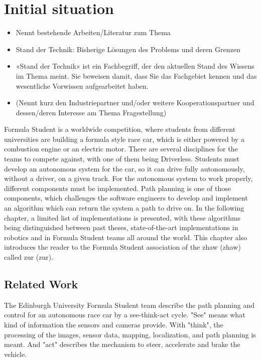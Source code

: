 \section{Initial situation} \label{sec:Initial situation}
\begin{itemize}
    \item Nennt bestehende Arbeiten/Literatur zum Thema
    \item Stand der Technik: Bisherige Lösungen des Problems und deren Grenzen
    \item «Stand der Technik» ist ein Fachbegriff, der den aktuellen Stand des Wissens im Thema meint. Sie beweisen damit, dass Sie das Fachgebiet kennen und das wesentliche Vorwissen aufgearbeitet haben.
    \item (Nennt kurz den Industriepartner und/oder weitere Kooperationspartner und dessen/deren Interesse am Thema Fragestellung)
\end{itemize}
Formula Student is a worldwide competition, where students from different universities are building a formula style race car, which is either powered by a combustion engine or an electric motor. There are several disciplines for the teams to compete against, with one of them being Driverless. Students must develop an autonomous system for the car, so it can drive fully autonomously, without a driver, on a given track. For the autonomous system to work properly, different components must be implemented. Path planning is one of those components, which challenges the software engineers to develop and implement an algorithm which can return the system a path to drive on. In the following chapter, a limited list of implementations is presented, with these algorithms being distinguished between past theses, state-of-the-art implementations in robotics and in Formula Student teams all around the world. This chapter also introduces the reader to the Formula Student association of the \acrlong{zhaw} (\acrshort{zhaw}) called \acrlong{zur} (\acrshort{zur}).

\subsection{Related Work} \label{sec:Related Work}
The Edinburgh University Formula Student team describe the path planning and control for an autonomous race car by a see-think-act cycle. "See" means what kind of information the sensors and cameras provide. With "think", the processing of the images, sensor data, mapping, localization, and path planning is meant. And "act" describes the mechanism to steer, accelerate and brake the vehicle.

